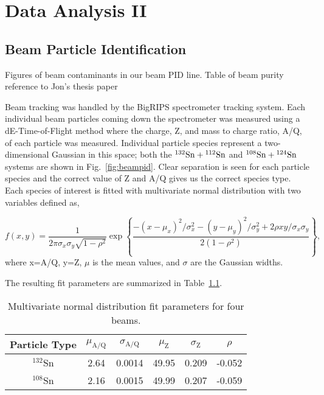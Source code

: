 \chapter{Data Analysis II}

\section{Beam Particle Identification}
Figures of beam contaminants in our beam PID line. 
Table of beam purity reference to Jon's thesis paper

Beam tracking was handled by the BigRIPS spectrometer tracking system. Each individual beam particles coming down the spectrometer was measured using a dE-Time-of-Flight method where the charge, Z, and mass to charge ratio, A/Q, of each particle was measured. Individual particle species represent a two-dimensional Gaussian in this space; both the ${}^{132}\mathrm{Sn} + {}^{112}\mathrm{Sn}$ and ${}^{108}\mathrm{Sn} + {}^{124}\mathrm{Sn}$ systems are shown in Fig.~\ref{fig:beampid}. Clear separation is seen for each particle species and the correct value of Z and A/Q gives us the correct species type. Each species of interest is fitted with multivariate normal distribution with two variables defined as,

\begin{equation}
  f(x,y)=\frac1{2\pi\sigma_x\sigma_y\sqrt{1-\rho^2}}\exp\left\{
  \frac{-(x - \mu_{x})^2/\sigma_x^2-(y-\mu_{y})^2/\sigma_y^2+2\rho
  xy/\sigma_x\sigma_y}{2(1-\rho^2)}\right\},
   \label{multiGauss}
\end{equation}
where x=A/Q, y=Z, $\mu$ is the mean values, and $\sigma$ are the Gaussian widths. 

The resulting fit parameters are summarized in Table~\ref{beamParameters}. 
\begin{table}[H]
  \begin{center}
    \begin{tabular}{cccccc}
      \hline 
      Particle Type & $\mu_\mathrm{A/Q}$ & $\sigma_\mathrm{A/Q}$ & $\mu_\mathrm{Z}$ &
      $\sigma_\mathrm{Z}$ & $\rho$\\
      \hline\hline 
      ${}^{132}$Sn & 2.64 & 0.0014 & 49.95 & 0.209 & -0.052 \\
      ${}^{108}$Sn & 2.16 & 0.0015 & 49.99 & 0.207 & -0.059 \\
      \hline
    \end{tabular}
    \caption{Multivariate normal distribution fit parameters for four beams.
    \label{beamParameters}}
  \end{center}
\end{table}

